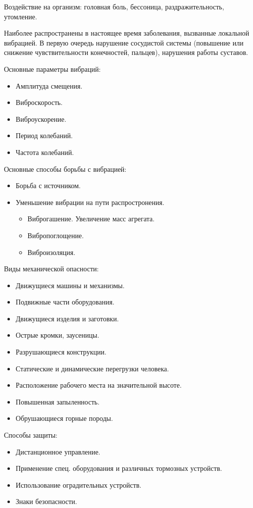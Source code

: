 Воздействие на организм: головная боль, бессоница, раздражительность, утомление. 

Наиболее распространены в настоящее время заболевания, вызванные локальной вибрацией. В первую очередь нарушение сосудистой системы (повышение или снижение чувствительности конечностей, пальцев), нарушения работы суставов.

Основные параметры вибраций:
\begin{itemize}
	\item Амплитуда смещения.
	\item Виброскорость.
	\item Виброускорение.
	\item Период колебаний.
	\item Частота колебаний.
\end{itemize}

Основные способы борьбы с вибрацией:
\begin{itemize}
	\item Борьба с источником.
	\item Уменьшение вибрации на пути распростронения.
	\begin{itemize}
		\item Виброгашение. Увеличение масс агрегата.
		\item Вибропоглощение.
		\item Виброизоляция.
	\end{itemize}
\end{itemize}

Виды механической опасности:
\begin{itemize}
	\item Движущиеся машины и механизмы.
	\item Подвижные части оборудования.
	\item Движущиеся изделия и заготовки.
	\item Острые кромки, заусеницы.
	\item Разрушающиеся конструкции.
	\item Статические и динамические перегрузки человека.
	\item Расположение рабочего места на значительной высоте.
	\item Повышенная запыленность.
	\item Обрушающиеся горные породы.
\end{itemize}

Способы защиты:
\begin{itemize}
	\item Дистанционное управление.
	\item Применение спец. оборудования и различных тормозных устройств.
	\item Использование оградительных устройств.
	\item Знаки безопасности.
\end{itemize}

